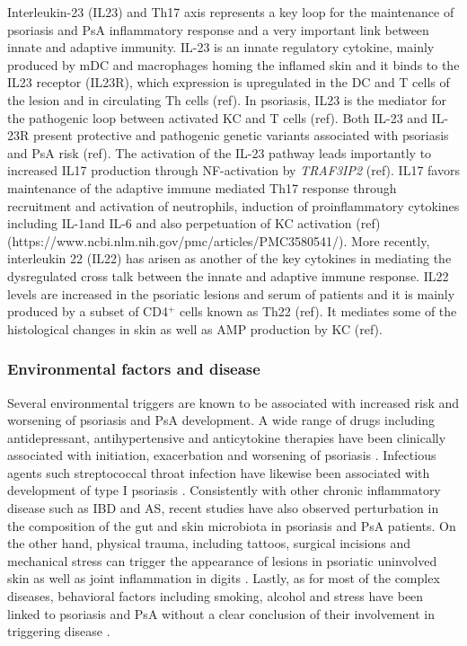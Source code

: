 Interleukin-23 (IL23) and Th17 axis represents a key loop for the maintenance of psoriasis and PsA inflammatory response and a very important link between innate and adaptive immunity. IL-23 is an innate regulatory cytokine, mainly produced by mDC and macrophages homing the inflamed skin and it binds to the IL23 receptor (IL23R), which expression is upregulated in the DC and T cells of the lesion and in circulating Th cells (ref). In psoriasis, IL23 is the mediator for the pathogenic loop between activated KC and T cells (ref). Both IL-23 and IL-23R present protective and pathogenic genetic variants associated with psoriasis and PsA risk (ref). The activation of the IL-23 pathway leads importantly to increased IL17 production through NF-\kappaB activation by \textit{TRAF3IP2} (ref). IL17 favors maintenance of the adaptive immune mediated Th17 response through recruitment and activation of neutrophils, induction of proinflammatory cytokines including IL-1\beta and IL-6 and also perpetuation of KC activation (ref) (https://www.ncbi.nlm.nih.gov/pmc/articles/PMC3580541/). %
More recently, interleukin 22 (IL22) has arisen as another of the key cytokines in mediating the dysregulated cross talk between the innate and adaptive immune response. IL22 levels are increased in the psoriatic lesions and serum of patients and it is mainly produced by a subset of CD4$^+$ cells known as Th22 (ref). It mediates some of the histological changes in skin as well as AMP production by KC (ref).


\subsubsection{Environmental factors and disease}

Several environmental triggers are known to be associated with increased risk and worsening of psoriasis and PsA development. A wide range of drugs including antidepressant, antihypertensive and anticytokine therapies have been clinically associated with initiation, exacerbation and worsening of psoriasis \parencite{Kim2010}. Infectious agents such streptococcal throat infection have likewise been associated with development of type I psoriasis \parencite{Gudjonsson2003,Valdimarsson2009, Diluvio2006}. Consistently with other chronic inflammatory disease such as IBD and AS, recent studies have also observed perturbation in the composition of the gut and skin microbiota in psoriasis and PsA patients. On the other hand, physical trauma, including tattoos, surgical incisions and mechanical stress can trigger the appearance of lesions in psoriatic uninvolved skin as well as joint inflammation in digits \parencite {Weiss2002,Nestle2009}. Lastly, as for most of the complex diseases, behavioral factors including smoking, alcohol and stress have been linked to psoriasis and PsA without a clear conclusion of their involvement in triggering disease \parencite{Meglio2014}.

